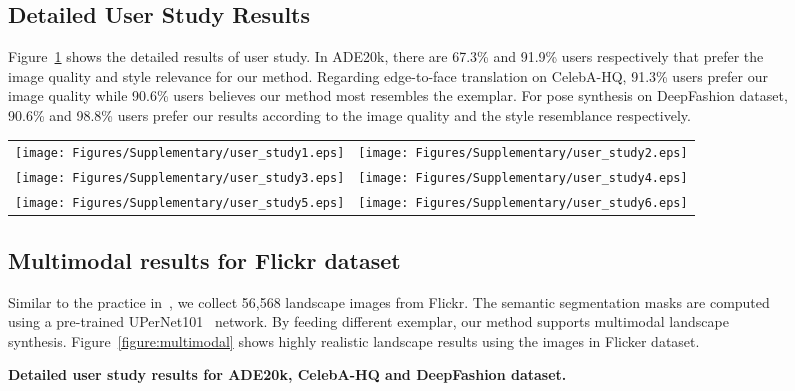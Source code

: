 \documentclass[10pt,twocolumn,letterpaper]{article}
\renewcommand{\arraystretch}{1.1}
\begin{document}
\begin{figure}[!t]
\clearpage
\subsection{Detailed User Study Results}
Figure~\ref{figure:userstudy_result} shows the detailed results of user study. In ADE20k, there are 67.3\%  and 91.9\% users respectively that prefer the image quality and style relevance for our method. Regarding edge-to-face translation on CelebA-HQ, 91.3\% users prefer our image quality while 90.6\% users believes our method most resembles the exemplar. For pose synthesis on DeepFashion dataset, 90.6\% and 98.8\% users prefer our results  according to the image quality and the style resemblance respectively.

\begin{figure*}[h!]
\center
\small
\setlength\tabcolsep{2pt}
{
\renewcommand{\arraystretch}{8.0}
\begin{tabular}{@{}cc@{}}
    \texttt{[image: Figures/Supplementary/user\_study1.eps]}&
    \texttt{[image: Figures/Supplementary/user\_study2.eps]}\\
    
    \texttt{[image: Figures/Supplementary/user\_study3.eps]}&
    \texttt{[image: Figures/Supplementary/user\_study4.eps]}\\
    
    \texttt{[image: Figures/Supplementary/user\_study5.eps]}&
    \texttt{[image: Figures/Supplementary/user\_study6.eps]}\\
\end{tabular}
}
\caption{\textbf{Detailed user study results for ADE20k, CelebA-HQ and DeepFashion dataset.}}
\label{figure:userstudy_result}
\end{figure*}

\clearpage
\subsection{Multimodal results for Flickr dataset}
Similar to the practice in~\cite{park2019semantic}, we collect 56,568 landscape images from Flickr. The semantic segmentation masks are computed using a pre-trained  UPerNet101~\cite{xiao2018unified} network. By feeding different exemplar, our method supports multimodal landscape synthesis. Figure~\ref{figure:multimodal} shows highly realistic landscape results using the images in Flicker dataset. 


\end{figure}
\end{document}
